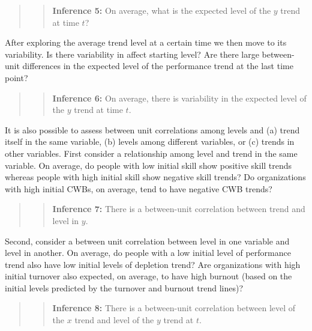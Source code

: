 \documentclass[english,,man]{apa6}
\theoremstyle{definition}
\theoremstyle{definition}
\theoremstyle{definition}
\theoremstyle{remark}
\begin{document}
\begin{quote}
\begin{quote}
\textbf{Inference 5:} On average, what is the expected level of the
\(y\) trend at time \(t\)?
\end{quote}
\end{quote}

After exploring the average trend level at a certain time we then move
to its variability. Is there variability in affect starting level? Are
there large between-unit differences in the expected level of the
performance trend at the last time point?

\begin{quote}
\begin{quote}
\textbf{Inference 6:} On average, there is variability in the expected
level of the \(y\) trend at time \(t\).
\end{quote}
\end{quote}

It is also possible to assess between unit correlations among levels and
(a) trend itself in the same variable, (b) levels among different
variables, or (c) trends in other variables. First consider a
relationship among level and trend in the same variable. On average, do
people with low initial skill show positive skill trends whereas people
with high initial skill show negative skill trends? Do organizations
with high initial CWBs, on average, tend to have negative CWB trends?

\begin{quote}
\begin{quote}
\textbf{Inference 7:} There is a between-unit correlation between trend
and level in \(y\).
\end{quote}
\end{quote}

Second, consider a between unit correlation between level in one
variable and level in another. On average, do people with a low initial
level of performance trend also have low initial levels of depletion
trend? Are organizations with high initial turnover also expected, on
average, to have high burnout (based on the initial levels predicted by
the turnover and burnout trend lines)?

\begin{quote}
\begin{quote}
\textbf{Inference 8:} There is a between-unit correlation between level
of the \(x\) trend and level of the \(y\) trend at \(t\).
\end{quote}
\end{quote}
\end{document}
